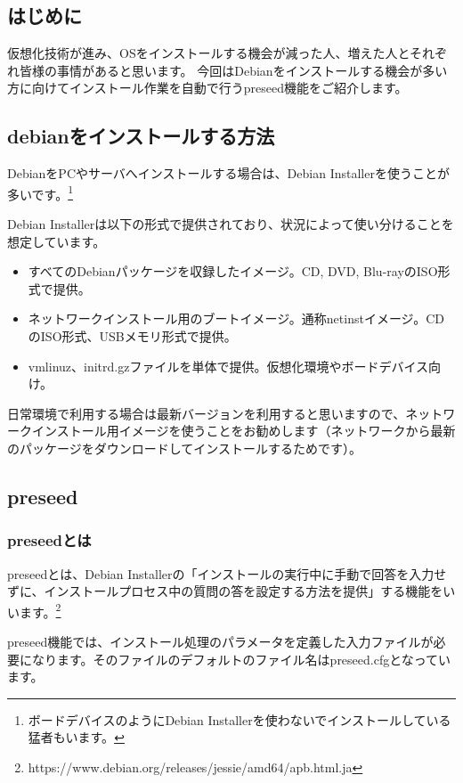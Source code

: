 \documentclass[mingoth,a4paper]{jsarticle}
\begin{document}
\subsection{はじめに}

仮想化技術が進み、OSをインストールする機会が減った人、増えた人とそれぞれ皆様の事情があると思います。
今回はDebianをインストールする機会が多い方に向けてインストール作業を自動で行うpreseed機能をご紹介します。

\subsection{debianをインストールする方法}

DebianをPCやサーバへインストールする場合は、Debian Installerを使うことが多いです。\footnote{ボードデバイスのようにDebian Installerを使わないでインストールしている猛者もいます。}

Debian Installerは以下の形式で提供されており、状況によって使い分けることを想定しています。

\begin{itemize}
\item すべてのDebianパッケージを収録したイメージ。CD, DVD, Blu-rayのISO形式で提供。
\item ネットワークインストール用のブートイメージ。通称netinstイメージ。CDのISO形式、USBメモリ形式で提供。
\item vmlinuz、initrd.gzファイルを単体で提供。仮想化環境やボードデバイス向け。
\end{itemize}

日常環境で利用する場合は最新バージョンを利用すると思いますので、ネットワークインストール用イメージを使うことをお勧めします（ネットワークから最新のパッケージをダウンロードしてインストールするためです）。


\subsection{preseed}
\subsubsection{preseedとは}

preseedとは、Debian Installerの「インストールの実行中に手動で回答を入力せずに、インストールプロセス中の質問の答を設定する方法を提供」する機能をいいます。\footnote{https://www.debian.org/releases/jessie/amd64/apb.html.ja}

preseed機能では、インストール処理のパラメータを定義した入力ファイルが必要になります。そのファイルのデフォルトのファイル名はpreseed.cfgとなっています。
\end{document}
